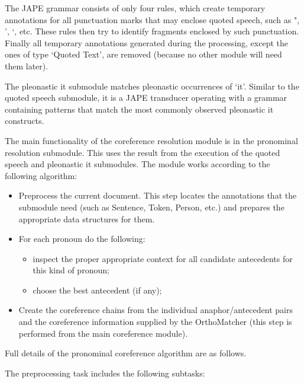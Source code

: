 The JAPE grammar consists of only four rules, which create temporary
annotations for all punctuation marks that may enclose quoted speech,
such as ", ', `, etc. These rules then try to identify fragments enclosed by
such punctuation. Finally all temporary annotations generated during
the processing, except the ones of type `Quoted Text', are removed
(because no other module will need them later).

The pleonastic it submodule matches pleonastic occurrences of
`it'. Similar to the quoted speech submodule, it is a JAPE
transducer operating with a grammar containing patterns that match the
most commonly observed pleonastic it constructs.



The main functionality of the coreference resolution module is in the
pronominal resolution submodule. This uses the result from
the execution of the quoted speech and pleonastic it submodules.
The module works according to the following algorithm:

\begin{itemize}

\item Preprocess the current document. This step locates the
annotations that the submodule need (such as Sentence, Token, Person,
etc.) and prepares the appropriate data structures for them.

\item For each pronoun do the following:
  \begin{itemize}
  \item inspect the proper appropriate context for all candidate
  antecedents for this kind of pronoun;

  \item choose the best antecedent (if any);
  \end{itemize}
\item Create the coreference chains from the individual
  anaphor/antecedent pairs and the coreference information supplied by
  the OrthoMatcher (this step is performed from the main coreference
  module).
\end{itemize}


Full details of the pronominal coreference algorithm are as follows.


The preprocessing task includes the following subtasks:

